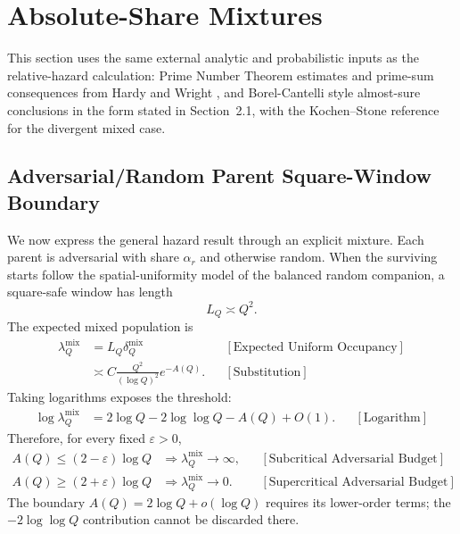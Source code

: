 \section{Absolute-Share Mixtures}
This section uses the same external analytic and probabilistic inputs as
the relative-hazard calculation: Prime Number Theorem estimates and
prime-sum consequences from Hardy and Wright \cite{hardywright2008}, and
Borel-Cantelli style almost-sure conclusions in the form stated in
Section~2.1, with the Kochen--Stone reference \cite{kochenstone1964} for
the divergent mixed case.
\subsection{Adversarial/Random Parent Square-Window Boundary}
We now express the general hazard result through an explicit mixture. Each parent is adversarial with share $\alpha_r$ and otherwise random. When the surviving starts follow the spatial-uniformity model of the balanced random companion, a square-safe window has length
\begin{equation*}
L_Q\asymp Q^2.
\end{equation*}
The expected mixed population is
\begin{equation*}
\begin{aligned}
\lambda_Q^{\mathrm{mix}}
&=L_Q\delta_Q^{\mathrm{mix}}
&&[\text{Expected Uniform Occupancy}]\\
&\asymp
C\frac{Q^2}{(\log Q)^2}e^{-A(Q)}.
&&[\text{Substitution}]
\end{aligned}
\end{equation*}
Taking logarithms exposes the threshold:
\begin{equation*}
\begin{aligned}
\log\lambda_Q^{\mathrm{mix}}
&=2\log Q-2\log\log Q-A(Q)+O(1).
&&[\text{Logarithm}]
\end{aligned}
\end{equation*}
Therefore, for every fixed $\varepsilon > 0$,
\begin{equation*}
\begin{aligned}
A(Q)\le(2-\varepsilon)\log Q
&\Longrightarrow
\lambda_Q^{\mathrm{mix}}\longrightarrow\infty,
&&[\text{Subcritical Adversarial Budget}]\\
A(Q)\ge(2+\varepsilon)\log Q
&\Longrightarrow
\lambda_Q^{\mathrm{mix}}\longrightarrow0.
&&[\text{Supercritical Adversarial Budget}]
\end{aligned}
\end{equation*}
The boundary $A(Q)=2\log Q+o(\log Q)$ requires its lower-order terms; the $-2\log\log Q$ contribution cannot be discarded there.
